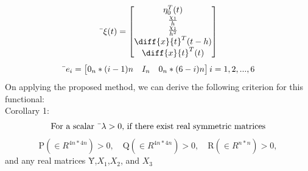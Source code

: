 \documentclass[journal]{IEEEtran}
\begin{document}
\begin{equation}
\text{\={$\xi(t)$}} = 
\begin{bmatrix}
\eta^{T}_{0}(t) \\ 
 \frac{\chi_1}{h} \\ 
 \frac{\chi_1}{h^2} \\
\diff{x}{t}^T(t - h) \\
\diff{x}{t}^T(t) \\
\end{bmatrix}
\end{equation}
\begin{equation}
\text{\={$e_i$}} = 
\begin{bmatrix}
0_n*(i-1)n & I_n & 0_n*(6-i)n  
\end{bmatrix}
i=1,2,...,6
\end{equation}
On applying the proposed method, we can derive the following criterion for this functional: 
\\
Corollary 1:
\begin{equation}
\text{For a scalar \={$\lambda$}} > 0 \text{, if there exist real symmetric matrices}
\end{equation}
\begin{equation}
\text{\={P}} (\text{$\in {R^{4n*4n}}$}) > 0, \quad  \text{\={Q}}(\text{$\in {R^{4n*4n}}$}) > 0, \quad \text{\={R}} (\text{$\in {R^{n*n}}$}) > 0,
\end{equation}
and any real matrices {\={Y}},{\={$X_1$}},{\={$X_2$}}, and {\={$X_3$}}
\end{document}
